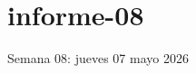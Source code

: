 \documentclass[./informes.tex]{subfiles}
\begin{document}
\chapter{informe-08}

Semana 08: jueves 07 mayo 2026








\printbibliography[
  heading=subbibliography
]
\end{document}
